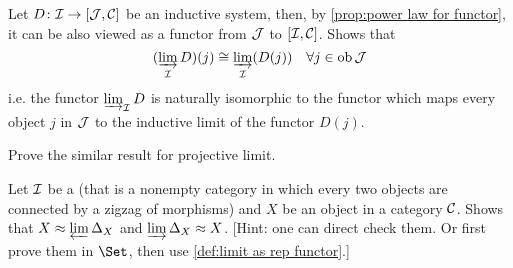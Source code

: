   \begin{ex}
    Let $D\colon{\cal I}\to[{\cal J},{\cal C}]$ be an inductive system, then, by \ref{prop:power law for functor}, it can be also viewed as a functor from ${\cal J}$ to $[{\cal I},{\cal C}]$.
    Shows that
    \begin{equation*}
      (\operatorname*{\underrightarrow{\lim}}_{{\cal I}}D)(j)\cong\operatorname*{\underrightarrow{\lim}}_{{\cal I}}(D(j))\quad\forall j\in\operatorname{ob}{\cal J}
    \end{equation*}
    i.e. the functor $\operatorname*{\underrightarrow{\lim}}_{{\cal I}}D$ is naturally isomorphic to the functor which maps every object $j$ in ${\cal J}$ to the inductive limit of the functor $D(j)$.

    Prove the similar result for projective limit.
  \end{ex}

  \begin{ex}
    Let ${\cal I}$ be a  (that is a nonempty category in which every two objects are connected by a zigzag of morphisms) and $X$ be an object in a category ${\cal C}$. Shows that $X\approx\operatorname*{\underleftarrow{\lim}}\Delta_X$ and $\operatorname*{\underrightarrow{\lim}}\Delta_X\approx X$.
    [Hint: one can direct check them. Or first prove them in $\Set$, then use \ref{def:limit as rep functor}.]
  \end{ex}


